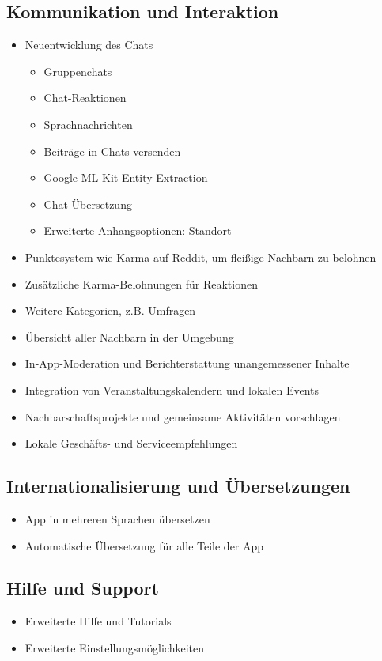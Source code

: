 \subsection{Kommunikation und Interaktion}
\begin{itemize}
  \item Neuentwicklung des Chats
        \begin{itemize}
          \item Gruppenchats
          \item Chat-Reaktionen
          \item Sprachnachrichten
          \item Beiträge in Chats versenden
          \item Google ML Kit Entity Extraction
          \item Chat-Übersetzung
          \item Erweiterte Anhangsoptionen: Standort
        \end{itemize}
  \item Punktesystem wie Karma auf Reddit, um fleißige Nachbarn zu belohnen
  \item Zusätzliche Karma-Belohnungen für Reaktionen
  \item Weitere Kategorien, z.B. Umfragen
  \item Übersicht aller Nachbarn in der Umgebung
  \item In-App-Moderation und Berichterstattung unangemessener Inhalte
  \item Integration von Veranstaltungskalendern und lokalen Events
  \item Nachbarschaftsprojekte und gemeinsame Aktivitäten vorschlagen
  \item Lokale Geschäfts- und Serviceempfehlungen
\end{itemize}

\subsection{Internationalisierung und Übersetzungen}
\begin{itemize}
  \item App in mehreren Sprachen übersetzen
  \item Automatische Übersetzung für alle Teile der App
\end{itemize}

\subsection{Hilfe und Support}
\begin{itemize}
  \item Erweiterte Hilfe und Tutorials
  \item Erweiterte Einstellungsmöglichkeiten
\end{itemize}

